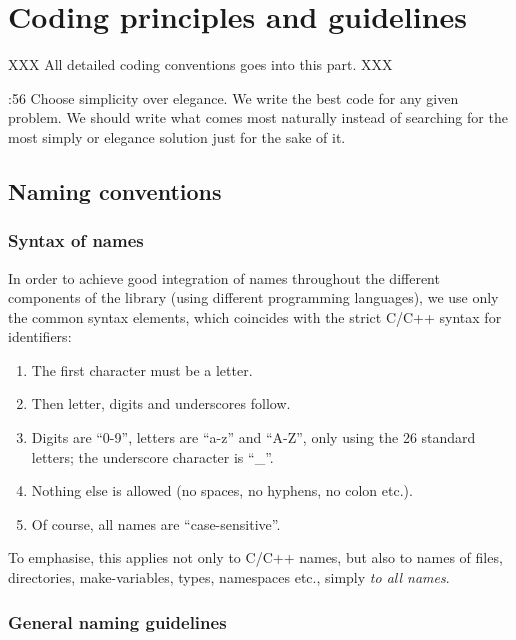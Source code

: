 \documentclass{book}
\begin{document}
\part{Coding principles and guidelines}
\label{par:Programming}


XXX All detailed coding conventions goes into this part. XXX

\cite{OKL_MisfeldtBumgardnerGray2004CppStyle}:56 Choose simplicity over elegance. We write the best code for any given problem. We should write what comes most naturally instead of searching for the most simply or elegance solution just for the sake of it. 












\chapter{Naming conventions}
\label{cha:Naming}



\section{Syntax of names}
\label{sec:Syntaxnames}

In order to achieve good integration of names throughout the different components of the library (using different programming languages), we use only the common syntax elements, which coincides with the strict C/C++ syntax for identifiers:
\begin{enumerate}
\item The first character must be a letter.
\item Then letter, digits and underscores follow.
\item Digits are ``0-9'', letters are ``a-z'' and ``A-Z'', only using the 26 standard letters; the underscore character is ``\_''.
\item Nothing else is allowed (no spaces, no hyphens, no colon etc.).
\item Of course, all names are ``case-sensitive''.
\end{enumerate}
To emphasise, this applies not only to C/C++ names, but also to names of files, directories, make-variables, types, namespaces etc., simply \emph{to all names}.




\section{General naming guidelines}
\label{sec:GenNaming}
\end{document}
